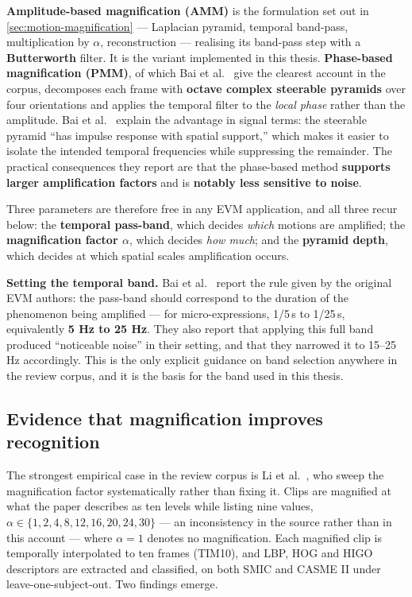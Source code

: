 \textbf{Amplitude-based magnification (AMM)} is the formulation set out in \autoref{sec:motion-magnification} --- Laplacian pyramid, temporal band-pass, multiplication by $\alpha$, reconstruction --- realising its band-pass step with a \textbf{Butterworth} filter. It is the variant implemented in this thesis. \textbf{Phase-based magnification (PMM)}, of which Bai et al.~\cite{bai2021} give the clearest account in the corpus, decomposes each frame with \textbf{octave complex steerable pyramids} over four orientations and applies the temporal filter to the \textit{local phase} rather than the amplitude. Bai et al.~\cite{bai2021} explain the advantage in signal terms: the steerable pyramid ``has impulse response with spatial support,'' which makes it easier to isolate the intended temporal frequencies while suppressing the remainder. The practical consequences they report are that the phase-based method \textbf{supports larger amplification factors} and is \textbf{notably less sensitive to noise}.

Three parameters are therefore free in any EVM application, and all three recur below: the \textbf{temporal pass-band}, which decides \textit{which} motions are amplified; the \textbf{magnification factor $\alpha$}, which decides \textit{how much}; and the \textbf{pyramid depth}, which decides at which spatial scales amplification occurs.

\textbf{Setting the temporal band.} Bai et al.~\cite{bai2021} report the rule given by the original EVM authors: the pass-band should correspond to the duration of the phenomenon being amplified --- for micro-expressions, 1/5\,s to 1/25\,s, equivalently \textbf{5 Hz to 25 Hz}. They also report that applying this full band produced ``noticeable noise'' in their setting, and that they narrowed it to 15--25 Hz accordingly. This is the only explicit guidance on band selection anywhere in the review corpus, and it is the basis for the band used in this thesis.

\subsection{Evidence that magnification improves recognition}
\label{sec:evm-evidence}

The strongest empirical case in the review corpus is Li et al.~\cite{liX2018}, who sweep the magnification factor systematically rather than fixing it. Clips are magnified at what the paper describes as ten levels while listing nine values, $\alpha \in \{1, 2, 4, 8, 12, 16, 20, 24, 30\}$ --- an inconsistency in the source rather than in this account --- where $\alpha = 1$ denotes no magnification. Each magnified clip is temporally interpolated to ten frames (TIM10), and LBP, HOG and HIGO descriptors are extracted and classified, on both SMIC and CASME II under leave-one-subject-out. Two findings emerge.

